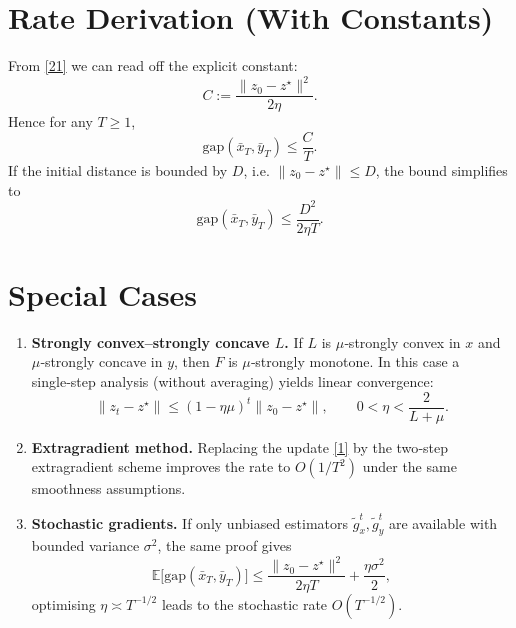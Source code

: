 \documentclass{article}
\begin{document}
\section*{Rate Derivation (With Constants)}
From \eqref{21} we can read off the explicit constant:
\[
C:=\frac{\|z_{0}-z^{\star}\|^{2}}{2\eta}.
\]
Hence for any $T\ge1$,
\[
\text{gap}(\bar x_{T},\bar y_{T})\le \frac{C}{T}.
\]
If the initial distance is bounded by $D$, i.e. $\|z_{0}-z^{\star}\|\le D$, the bound simplifies to
\[
\text{gap}(\bar x_{T},\bar y_{T})\le \frac{D^{2}}{2\eta T}.
\]

\section*{Special Cases}
\begin{enumerate}
\item \textbf{Strongly convex–strongly concave $L$.} If $L$ is $\mu$‑strongly convex in $x$ and $\mu$‑strongly concave in $y$, then $F$ is $\mu$‑strongly monotone. In this case a single‑step analysis (without averaging) yields linear convergence:
\[
\|z_{t}-z^{\star}\|\le (1-\eta\mu)^{t}\|z_{0}-z^{\star}\|,
\qquad 0<\eta<\frac{2}{L+\mu}.
\]

\item \textbf{Extragradient method.} Replacing the update \eqref{1} by the two‑step extragradient
scheme improves the rate to $O(1/T^{2})$ under the same smoothness assumptions.

\item \textbf{Stochastic gradients.} If only unbiased estimators $\tilde g_{x}^{t},\tilde g_{y}^{t}$
are available with bounded variance $\sigma^{2}$, the same proof gives
\[
\mathbb{E}\bigl[\text{gap}(\bar x_{T},\bar y_{T})\bigr]
\le
\frac{\|z_{0}-z^{\star}\|^{2}}{2\eta T}
+ \frac{\eta\sigma^{2}}{2},
\]
optimising $\eta\asymp T^{-1/2}$ leads to the stochastic rate $O(T^{-1/2})$.
\end{enumerate}
\end{document}
